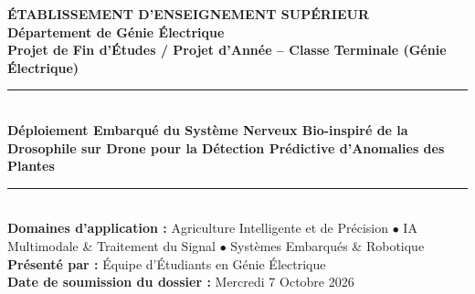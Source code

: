 \documentclass[11pt,a4paper]{article}
\begin{document}
\begin{center}
    {\Large \textbf{ÉTABLISSEMENT D'ENSEIGNEMENT SUPÉRIEUR}}\\[0.2cm]
    {\large \textbf{Département de Génie Électrique}}\\[0.1cm]
    {\small \textbf{Projet de Fin d'Études / Projet d'Année -- Classe Terminale (Génie Électrique)}}\\[0.4cm]
    
    \rule{\linewidth}{0.8pt}\\[0.3cm]
    {\LARGE \bfseries \color{primaryblue} Déploiement Embarqué du Système Nerveux Bio-inspiré de la Drosophile sur Drone pour la Détection Prédictive d'Anomalies des Plantes} \\[0.3cm]
    \rule{\linewidth}{0.8pt}\\[0.4cm]
    
    \textbf{Domaines d'application :} Agriculture Intelligente et de Précision $\bullet$ IA Multimodale \& Traitement du Signal $\bullet$ Systèmes Embarqués \& Robotique \\
    \textbf{Présenté par :} Équipe d'Étudiants en Génie Électrique \\
    \textbf{Date de soumission du dossier :} Mercredi 7 Octobre 2026
\end{center}

\vspace{0.3cm}

\begin{abstract}
\noindent Ce document constitue le dossier de cadrage scientifique et technique pour notre projet d'année en Génie Électrique. Le projet vise à modéliser, simplifier et embarquer la dynamique du système nerveux (cerveau central CNS et chaîne nerveuse ventrale VNC) de la drosophile (\textit{Drosophila melanogaster}) sur un micro-drone d'inspection agricole. En combinant des capteurs d'olfaction chimique (détection précoce des composés organiques volatils COV) et une vision rétinienne bio-inspirée, le drone réalise un diagnostic prédictif des pathologies végétales avant l'apparition de symptômes visibles, tout en réduisant drastiquement la consommation énergétique embarquée grâce au calcul neuromorphique.
\end{abstract}

\vspace{0.2cm}
\end{document}
